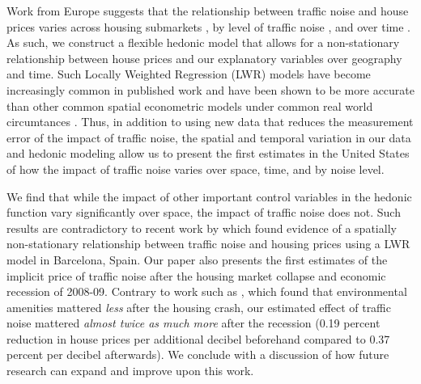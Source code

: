 \documentclass{article}\usepackage{graphicx, color}
\begin{document}

Work from Europe suggests that the relationship between traffic noise and house prices varies across housing submarkets \citep{Day2007, MarmolejoDuarteCarlos;GonzalezTamez2009}, by level of traffic noise \citep{Theebe2004a, Brandt2011}, and over time \cite{Wilhelmsson2000}. As such, we construct a flexible hedonic model that allows for a non-stationary relationship between house prices and our explanatory variables over geography and time. Such Locally Weighted Regression (LWR) models have become increasingly common in published work \citep[see][]{MarmolejoDuarteCarlos;GonzalezTamez2009, Carruthers2010, Sunding2010, Nappi-Choulet2011} and have been shown to be more accurate than other common spatial econometric models under common real world circumtances \citep{McMillen2012}. Thus, in addition to using new data that reduces the measurement error of the impact of traffic noise, the spatial and temporal variation in our data and hedonic modeling allow us to present the first estimates in the United States of how the impact of traffic noise varies over space, time, and by noise level. 

We find that while the impact of other important control variables in the hedonic function vary significantly over space, the impact of traffic noise does not. Such results are contradictory to recent work by \citet{MarmolejoDuarteCarlos;GonzalezTamez2009} which found evidence of a spatially non-stationary relationship between traffic noise and housing prices using a LWR model in Barcelona, Spain. Our paper also presents the first estimates of the implicit price of traffic noise after the housing market collapse and economic recession of 2008-09. Contrary to work such as \citet{Cho2011b}, which found that environmental amenities mattered \emph{less} after the housing crash, our estimated effect of traffic noise mattered \emph{almost twice as much more} after the recession (0.19 percent reduction in house prices per additional decibel beforehand compared to 0.37 percent per decibel afterwards). We conclude with a discussion of how future research can expand and improve upon this work.
 
\end{document}
